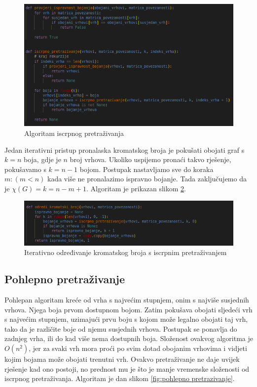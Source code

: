 \documentclass[times, utf8, zavrsni]{fer}
\begin{document}
\begin{figure}[htb]
\centering
\includegraphics[width=12cm]{images/iscrpno_pretrazivanje.png}
\caption{Algoritam iscrpnog pretraživanja}
\label{fig:algoritam iscrpnog pretraživanja}
\end{figure}

Jedan iterativni pristup pronalaska kromatskog broja je pokušati obojati graf s $k=n$ boja, gdje je $n$ broj vrhova. Ukoliko uspijemo pronaći takvo rješenje, pokušavamo s $k=n-1$ bojom. Postupak nastavljamo sve do koraka $m: (m < n)$ kada više ne pronalazimo ispravno bojanje. Tada zaključujemo da je $\chi(G)=k=n-m+1$. Algoritam je prikazan slikom \ref{fig:algoritam iterativnog iscprnog odredivanja kromatskog broja}.

\begin{figure}[htb]
\centering
\includegraphics[width=12cm]{images/iterativni_algoritam_iscprnog_pretrazivanja.png}
\caption{Iterativno određivanje kromatskog broja s iscrpnim pretraživanjem}
\label{fig:algoritam iterativnog iscprnog odredivanja kromatskog broja}
\end{figure}

\subsection{Pohlepno pretraživanje}
Pohlepan algoritam kreće od vrha s najvećim stupnjem, onim s najviše susjednih vrhova. Njega boja prvom dostupnom bojom. Zatim pokušava obojati sljedeći vrh s najvećim stupnjem, uzimajući prvu boju s kojom može legalno obojati taj vrh, tako da je različite boje od njemu susjednih vrhova. Postupak se ponavlja do zadnjeg vrha, ili do kad više nema dostupnih boja. Složenost ovakvog algoritma je $O(n^2)$, jer za svaki vrh mora proći po svim dotad obojanim vrhovima i vidjeti kojim bojama može obojati trenutni vrh. Ovakvo pretraživanje ne daje uvijek rješenje kad ono postoji, no prednost mu je što je manje vremenske složenosti od iscrpnog pretraživanja. Algoritam je dan slikom \ref{fig:pohlepno pretrazivanje}.
\end{document}
